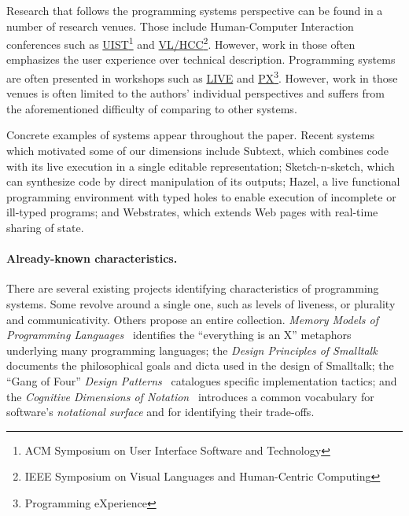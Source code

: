 \documentclass[english,submission]{programming}
\providecommand{\DIFadd}[1]{{\protect\color{blue}\uwave{#1}}} %
\providecommand{\DIFaddbegin}{} %
\providecommand{\DIFaddend}{} %
\begin{document}
Research that follows the programming systems perspective can be found
in a number of research venues. Those include Human-Computer Interaction
conferences such as \href{https://uist.acm.org/}{UIST}\footnote{ACM
  Symposium on User Interface Software and Technology} and
\href{https://conferences.computer.org/VLHCC/}{VL/HCC}\footnote{IEEE
  Symposium on Visual Languages and Human-Centric Computing}. However,
work in those often emphasizes the user experience over technical
description. Programming systems are often presented in workshops such
as \href{https://liveprog.org/}{LIVE} and
\href{https://2021.programming-conference.org/home/px-2021}{PX}\footnote{Programming
  eXperience}. However, work in those venues is often limited to the
authors' individual perspectives and suffers from the aforementioned
difficulty of comparing to other systems.

Concrete examples of systems appear throughout the paper. Recent systems
which motivated some of our dimensions include Subtext\DIFaddbegin \DIFadd{~}\DIFaddend \cite{Subtext},
which combines code with its live execution in a single editable
representation; Sketch-n-sketch\DIFaddbegin \DIFadd{~}\DIFaddend \cite{SnS}, which can synthesize code by
direct manipulation of its outputs; Hazel\DIFaddbegin \DIFadd{~}\DIFaddend \cite{Hazel}, a live
functional programming environment with typed holes to enable execution
of incomplete or ill-typed programs; and Webstrates\DIFaddbegin \DIFadd{~}\DIFaddend \cite{Webstrates},
which extends Web pages with real-time sharing of state.

\paragraph{Already-known characteristics.}

There are several existing projects identifying characteristics of
programming systems. Some revolve around a single one, such as levels of
liveness\DIFaddbegin \DIFadd{~}\DIFaddend \cite{Liveness}, or plurality and
communicativity\DIFaddbegin \DIFadd{~}\DIFaddend \cite{KellComm}. Others propose an entire collection.
\emph{Memory Models of Programming Languages}~\cite{MemMod} identifies
the ``everything is an X'' metaphors underlying many programming
languages; the \emph{Design Principles of Smalltalk}~\cite{STdesign}
documents the philosophical goals and dicta used in the design of
Smalltalk; the ``Gang of Four'' \emph{Design Patterns}~\cite{DesPats}
catalogues specific implementation tactics; and the \emph{Cognitive
Dimensions of Notation}~\cite{CogDims} introduces a common vocabulary
for software's \emph{notational surface} and for identifying their
trade-offs.
\end{document}
